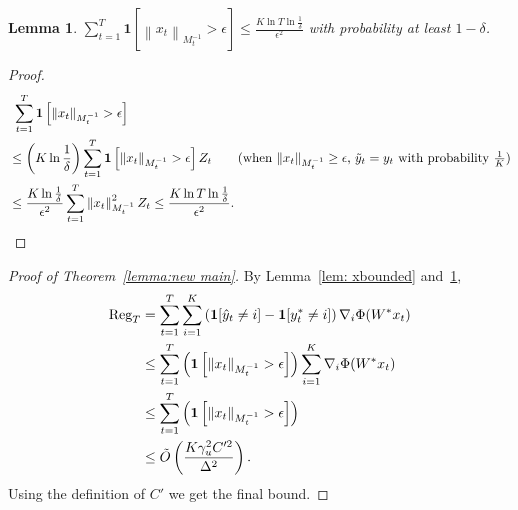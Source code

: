 \documentclass{article}
\newcommand{\Reg}{\text{\rm Reg}}
\newcommand{\one}{\boldsymbol{1}}
\newcommand{\norm}[1]{\left\|{#1}\right\|}
\newtheorem{lemma}[theorem]{Lemma}
\begin{document}
\begin{lemma}
\label{lem:N}
$ \sum_{t=1}^T \one\left[\norm{x_t}_{M_t^{-1}}> \epsilon\right] \leq \frac{K\ln T\ln \frac{1}{\delta}}{\epsilon^2}$ with probability at least $1-\delta$. 
\end{lemma}

\begin{proof}
\begin{align*}
    &~ \sum_{t=1}^T \one\left[\norm{x_t}_{M_t^{-1}}> \epsilon\right]\\
    &\leq \left(K\ln \frac{1}{\delta}\right)\sum_{t=1}^T \one\left[\norm{x_t}_{M_t^{-1}}> \epsilon\right]Z_t \tag{when $\|x_t\|_{M_t^{-1}}\geq \epsilon$, $\tilde{y}_t=y_t$ with probability $\frac{1}{K}$} \\
    & \leq \frac{K\ln \frac{1}{\delta}}{\epsilon^2}\sum_{t=1}^T \norm{x_t}_{M_t^{-1}}^2 Z_t \leq \frac{K\ln T\ln \frac{1}{\delta}}{\epsilon^2}. 
\end{align*}
\end{proof}

\begin{proof}[Proof of Theorem~\ref{lemma:new main}]
    By Lemma~\ref{lem: xbounded} and~\ref{lem:N}, 
    \begin{align*}
        \Reg_T &= \sum_{t=1}^T \sum_{i=1}^K \left(\one[\hat{y}_t\neq i] - \one[y^*_t\neq i]\right)\nabla_i\Phi(W^*x_t) \\
        & \leq \sum_{t=1}^T \left(\one\left[\|x_t\|_{M_t^{-1}}>\epsilon\right]\right) \sum_{i=1}^K \nabla_i\Phi(W^*x_t) \\
        & \leq \sum_{t=1}^T \left(\one\left[\|x_t\|_{M_t^{-1}}>\epsilon\right]\right) \\
        & \leq \tilde{O}\left( \frac{K\gamma_u^2C'^2}{\Delta^2} \right). 
    \end{align*}
    Using the definition of $C'$ we get the final bound. 
\end{proof}
\end{document}
